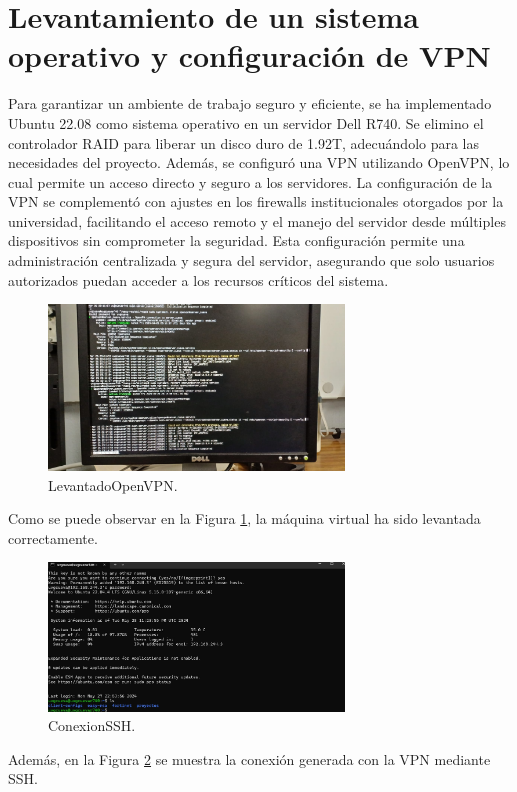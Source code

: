 

\section{Levantamiento de un sistema operativo y configuración de VPN}

Para garantizar un ambiente de trabajo seguro y eficiente, se ha implementado Ubuntu 22.08 como sistema operativo en un servidor Dell R740. Se elimino el controlador RAID para liberar un disco duro de 1.92T, adecuándolo para las necesidades del proyecto. Además, se configuró una VPN utilizando OpenVPN, lo cual permite un acceso directo y seguro a los servidores. La configuración de la VPN se complementó con ajustes en los firewalls institucionales otorgados por la universidad, facilitando el acceso remoto y el manejo del servidor desde múltiples dispositivos sin comprometer la seguridad. Esta configuración permite una administración centralizada y segura del servidor, asegurando que solo usuarios autorizados puedan acceder a los recursos críticos del sistema.

\begin{figure}[H]
    \centering
    \includegraphics[width=0.7\textwidth]{figuras/LevantadoOpenVPN.png}
    \caption{LevantadoOpenVPN.}
    \label{fig:LevantadoOpenVPN}
\end{figure}
Como se puede observar en la Figura \ref{fig:LevantadoOpenVPN}, la máquina virtual ha sido levantada correctamente.

\begin{figure}[H]
    \centering
    \includegraphics[width=0.7\textwidth]{figuras/ConexionSSH.png}
    \caption{ConexionSSH.}
    \label{fig:ConexionSSH}
\end{figure}
Además, en la Figura \ref{fig:ConexionSSH} se muestra la conexión generada con la VPN mediante SSH.


